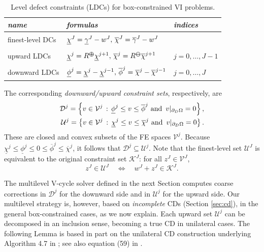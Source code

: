 \documentclass[letterpaper,final,12pt,reqno]{amsart}
\theoremstyle{cstyle}
\theoremstyle{cstyle*}
\theoremstyle{dstyle}
\numberwithin{equation}{section}
\numberwithin{figure}{section}
\numberwithin{table}{section}
\numberwithin{theorem}{section}
\newcommand{\maxR}{R^{\bm{\oplus}}}
\newcommand{\minR}{R^{\bm{\ominus}}}
\begin{document}
\begin{table}[H]
\begin{tabular}{lll}
\emph{name}         & \emph{formulas} & \emph{indices} \\ \hline
finest-level DCs & ${\Large \strut} \underline{\chi}^J = \underline{\gamma}^J - w^J,\, \overline{\chi}^J = \overline{\gamma}^J - w^J$ \\
upward LDCs  & ${\Large \strut} \underline{\chi}^{j} = \maxR \underline{\chi}^{j+1}, \, \overline{\chi}^{j} = \minR \overline{\chi}^{j+1}$ & $j=0,\dots,J-1$ \\
downward LDCs       & ${\Large \strut} \underline{\phi}^j = \underline{\chi}^j - \underline{\chi}^{j-1}, \, \overline{\phi}^j = \overline{\chi}^j - \overline{\chi}^{j-1}$ & $j=0,\dots,J$
\end{tabular}

\medskip
\caption{Level defect constraints (LDCs) for box-constrained VI problems.}
\label{tab:ldcs}
\end{table}

The corresponding \emph{downward/upward constraint sets}, respectively, are
\begin{align}
\mathcal{D}^j = \left\{v \in \mathcal{V}^j \,:\, \underline{\phi}^j \le v \le \overline{\phi}^j \text{ and } \, v|_{\partial_D\Omega} = 0\right\}, \label{eq:fe:constraintsets} \\
\mathcal{U}^j = \left\{v \in \mathcal{V}^j \,:\, \underline{\chi}^j \le v \le \overline{\chi}^j \text{ and } \, v|_{\partial_D\Omega} = 0\right\}. \notag
\end{align}
These are closed and convex subsets of the FE spaces $\mathcal{V}^j$.  Because $\underline{\chi}^j \le \underline{\phi}^j \le 0 \le \overline{\phi}^j \le \overline{\chi}^j$, it follows that $\mathcal{D}^j \subseteq \mathcal{U}^j$.  Note that the finest-level set $\mathcal{U}^J$ is equivalent to the original constraint set $\mathcal{K}^J$: for all $z^J \in \mathcal{V}^J$,
\begin{equation}
z^J \in \mathcal{U}^J \quad \iff \quad w^J+z^J \in \mathcal{K}^J. \label{eq:fe:finestlevelequivalent}
\end{equation}

The multilevel V-cycle solver defined in the next Section computes coarse corrections in $\mathcal{D}^j$ for the downward side and in $\mathcal{U}^j$ for the upward side.  Our multilevel strategy is, however, based on \emph{incomplete} CDs (Section \ref{sec:cd}), in the general box-constrained cases, as we now explain.  Each upward set $\mathcal{U}^j$ can be decomposed in an inclusion sense, becoming a true CD in unilateral cases.  The following Lemma is based in part on the unilateral CD construction underlying Algorithm 4.7 in \cite{GraeserKornhuber2009}; see also equation (59) in \cite{Tai2003}.
\end{document}
